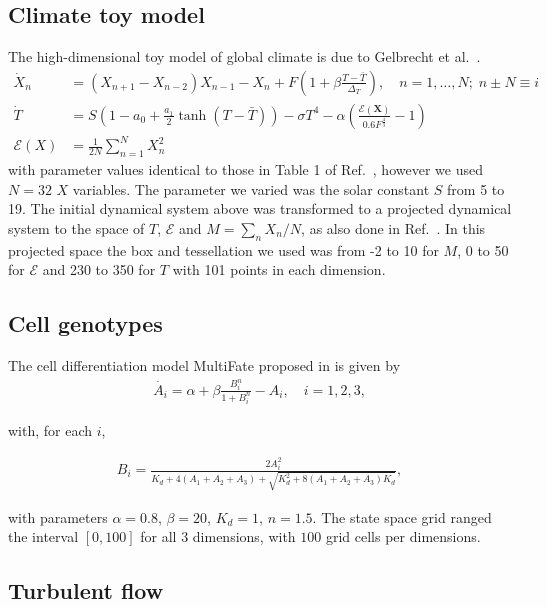 \documentclass[preprint,superscriptaddress,
nofootinbib,amsmath,amssymb,aps]{revtex4-1}
\begin{document}
\subsection*{Climate toy model} The high-dimensional toy model of global climate is due to Gelbrecht et al.~\cite{Gelbrecht2021}. 
\begin{align*}
    \dot{X}_n &= (X_{n+1} - X_{n-2})X_{n-1} - X_n + F \left(1 + \beta \frac{T - \bar{T}}{\Delta_T}\right) , \quad n = 1, \dots, N; \; n\pm N \equiv i \\ 
    \dot{T} &= S\left(1 - a_0 + \frac{a_1}{2}\tanh \left( T - \bar{T}\right)\right) - \sigma T^4 - \alpha\left( \frac{\mathcal{E} (\mathbf{X})}{0.6 F^{\tfrac{4}{3}}} - 1 \right) \\
    \mathcal{E}(X) &= \frac{1}{2N}\sum_{n=1}^{N}X_n^2
\end{align*}
with parameter values identical to those in Table 1 of Ref.~\cite{Gelbrecht2021}, however we used $N=32$ $X$ variables. The parameter we varied was the solar constant $S$ from 5 to 19. The initial dynamical system above was transformed to a projected dynamical system to the space of $T$, $\mathcal{E}$ and $M = \sum_n X_{n}/N$, as also done in Ref.~\cite{Gelbrecht2021}. In this projected space the box and tessellation we used was from -2 to 10 for $M$, 0 to 50 for $\mathcal{E}$ and 230 to 350 for $T$ with 101 points in each dimension.



\subsection*{Cell genotypes}
The cell differentiation model MultiFate proposed in \cite{zhu2022synthetic} is given by 
\begin{align*}
    \dot{A_i} = \alpha + \beta \frac{ B_i^n }{ 1 + B_i^n } - A_i, \quad i = 1, 2, 3, 
\end{align*}

with, for each $i$,

\begin{align*}
    B_i = \frac{2A_i^2}{ K_d + 4(A_1 + A_2 + A_3) + \sqrt{ K_d^2 + 8(A_1 + A_2 + A_3) K_d } }, 
\end{align*}

with parameters $\alpha = 0.8$, $\beta = 20$, $K_d = 1$, $n = 1.5$. 
The state space grid ranged the interval $[0, 100]$ for all $3$ dimensions, with $100$ grid cells per dimensions.

\subsection*{Turbulent flow}
\end{document}
